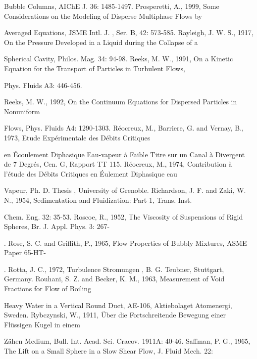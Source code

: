 \documentclass[11pt,a4paper,openany,fontset=none]{ctexbook}
\begin{document}
{\small\raggedright\noindent Bubble Columns, AIChE J. 36: 1485-1497. Prosperetti, A., 1999, Some Considerations on the Modeling of Disperse Multiphase Flows by\par}
{\small\raggedright\noindent Averaged Equations, JSME Intl. J. , Ser. B, 42: 573-585. Rayleigh, J. W. S., 1917, On the Pressure Developed in a Liquid during the Collapse of a\par}
{\small\raggedright\noindent Spherical Cavity, Philos. Mag. 34: 94-98. Reeks, M. W., 1991, On a Kinetic Equation for the Transport of Particles in Turbulent Flows,\par}
{\small\raggedright\noindent Phys. Fluids A3: 446-456.\par}
{\small\raggedright\noindent Reeks, M. W., 1992, On the Continuum Equations for Dispersed Particles in Nonuniform\par}
{\small\raggedright\noindent Flows, Phys. Fluids A4: 1290-1303. Réocreux, M., Barriere, G. and Vernay, B., 1973, Etude Expérimentale des Débits Critiques\par}
{\small\raggedright\noindent en Écoulement Diphasique Eau-vapeur à Faible Titre sur un Canal à Divergent de 7 Degrés, Cen. G, Rapport TT 115. Réocreux, M., 1974, Contribution à l’étude des Débits Critiques en Éulement Diphasique eau\par}
{\small\raggedright\noindent Vapeur, Ph. D. Thesis , University of Grenoble. Richardson, J. F. and Zaki, W. N., 1954, Sedimentation and Fluidization: Part 1, Trans. Inst.\par}
{\small\raggedright\noindent Chem. Eng. 32: 35-53. Roscoe, R., 1952, The Viscosity of Suspensions of Rigid Spheres, Br. J. Appl. Phys. 3: 267-\par}
{\small\raggedright{}. Rose, S. C. and Griffith, P., 1965, Flow Properties of Bubbly Mixtures, ASME Paper 65-HT-\par}
{\small\raggedright{}. Rotta, J. C., 1972, Turbulence Stromungen , B. G. Teubner, Stuttgart, Germany. Rouhani, S. Z. and Becker, K. M., 1963, Measurement of Void Fractions for Flow of Boiling\par}
{\small\raggedright\noindent Heavy Water in a Vertical Round Duct, AE-106, Aktiebolaget Atomenergi, Sweden. Rybczynski, W., 1911, Über die Fortschreitende Bewegung einer Flüssigen Kugel in einem\par}
{\small\raggedright\noindent Zähen Medium, Bull. Int. Acad. Sci. Cracov. 1911A: 40-46. Saffman, P. G., 1965, The Lift on a Small Sphere in a Slow Shear Flow, J. Fluid Mech. 22:\par}
\end{document}
